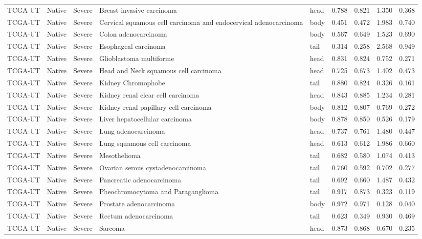 \begin{longtable}{lllllrrrr}
TCGA-UT & Native & Severe & Breast invasive carcinoma & head & 0.788 & 0.821 & 1.350 & 0.368 \\
TCGA-UT & Native & Severe & Cervical squamous cell carcinoma and endocervical adenocarcinoma & body & 0.451 & 0.472 & 1.983 & 0.740 \\
TCGA-UT & Native & Severe & Colon adenocarcinoma & body & 0.567 & 0.649 & 1.523 & 0.690 \\
TCGA-UT & Native & Severe & Esophageal carcinoma & tail & 0.314 & 0.258 & 2.568 & 0.949 \\
TCGA-UT & Native & Severe & Glioblastoma multiforme & head & 0.831 & 0.824 & 0.752 & 0.271 \\
TCGA-UT & Native & Severe & Head and Neck squamous cell carcinoma & head & 0.725 & 0.673 & 1.402 & 0.473 \\
TCGA-UT & Native & Severe & Kidney Chromophobe & tail & 0.880 & 0.824 & 0.326 & 0.161 \\
TCGA-UT & Native & Severe & Kidney renal clear cell carcinoma & head & 0.843 & 0.885 & 1.234 & 0.281 \\
TCGA-UT & Native & Severe & Kidney renal papillary cell carcinoma & body & 0.812 & 0.807 & 0.769 & 0.272 \\
TCGA-UT & Native & Severe & Liver hepatocellular carcinoma & body & 0.878 & 0.850 & 0.526 & 0.179 \\
TCGA-UT & Native & Severe & Lung adenocarcinoma & head & 0.737 & 0.761 & 1.480 & 0.447 \\
TCGA-UT & Native & Severe & Lung squamous cell carcinoma & head & 0.613 & 0.612 & 1.986 & 0.660 \\
TCGA-UT & Native & Severe & Mesothelioma & tail & 0.682 & 0.580 & 1.074 & 0.413 \\
TCGA-UT & Native & Severe & Ovarian serous cystadenocarcinoma & tail & 0.760 & 0.592 & 0.702 & 0.277 \\
TCGA-UT & Native & Severe & Pancreatic adenocarcinoma & tail & 0.692 & 0.660 & 1.487 & 0.432 \\
TCGA-UT & Native & Severe & Pheochromocytoma and Paraganglioma & tail & 0.917 & 0.873 & 0.323 & 0.119 \\
TCGA-UT & Native & Severe & Prostate adenocarcinoma & body & 0.972 & 0.971 & 0.128 & 0.040 \\
TCGA-UT & Native & Severe & Rectum adenocarcinoma & tail & 0.623 & 0.349 & 0.930 & 0.469 \\
TCGA-UT & Native & Severe & Sarcoma & head & 0.873 & 0.868 & 0.670 & 0.235 \\

\end{longtable}
